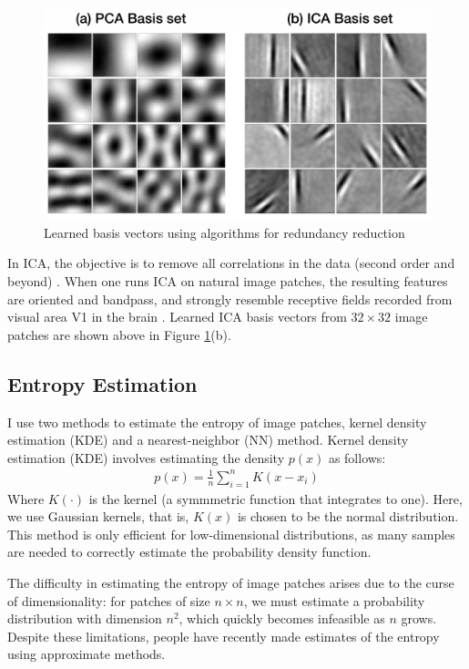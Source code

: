 \documentclass[10pt,twocolumn,letterpaper]{article}
\begin{document}
{\small
\centering
\begin{figure}
   \includegraphics[width=1.0\linewidth]{bases.jpg}
   \caption{Learned basis vectors using algorithms for redundancy reduction}
   \label{fig:bases}
\end{figure}
}
\noindent In ICA, the objective is to remove all correlations in the data (second order and beyond) \cite{ica}. When one runs ICA on natural image patches, the resulting features are oriented and bandpass, and strongly resemble receptive fields recorded from visual area V1 in the brain \cite{nis}. Learned ICA basis vectors from $32\times 32$ image patches are shown above in Figure \ref{fig:bases}(b).

\subsection{Entropy Estimation}
I use two methods to estimate the entropy of image patches, kernel density estimation (KDE) and a nearest-neighbor (NN) method. Kernel density estimation (KDE) involves estimating the density $p(x)$ as follows:
\begin{eqnarray}
    p(x) = \frac{1}{n}\sum_{i=1}^n K(x-x_i)
\end{eqnarray}
Where $K(\cdot)$ is the kernel (a symmmetric function that integrates to one). Here, we use Gaussian kernels, that is, $K(x)$ is chosen to be the normal distribution. This method is only efficient for low-dimensional distributions, as many samples are needed to correctly estimate the probability density function.

The difficulty in estimating the entropy of image patches arises due to the curse of dimensionality: for patches of size $n\times n$, we must estimate a probability distribution with dimension $n^2$, which quickly becomes infeasible as $n$ grows. Despite these limitations, people have recently made estimates of the entropy using approximate methods.
\end{document}
